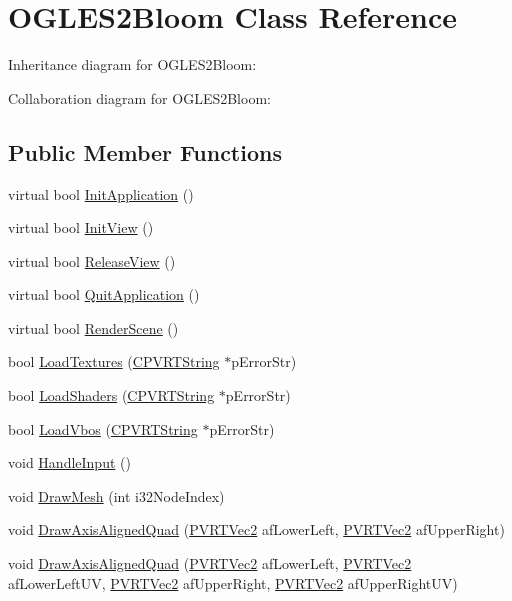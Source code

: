 \hypertarget{class_o_g_l_e_s2_bloom}{\section{O\+G\+L\+E\+S2\+Bloom Class Reference}
\label{class_o_g_l_e_s2_bloom}
}


Inheritance diagram for O\+G\+L\+E\+S2\+Bloom\+:


Collaboration diagram for O\+G\+L\+E\+S2\+Bloom\+:
\subsection*{Public Member Functions}
\begin{DoxyCompactItemize}
\item 
virtual bool \hyperlink{class_o_g_l_e_s2_bloom_a119c6ffe038283884e146738e336a3c4}{Init\+Application} ()
\item 
virtual bool \hyperlink{class_o_g_l_e_s2_bloom_a9f69f52e27a8913028fc9274da4ebfc2}{Init\+View} ()
\item 
virtual bool \hyperlink{class_o_g_l_e_s2_bloom_ae867ef7b57ab6e572bfea8a462c60dc1}{Release\+View} ()
\item 
virtual bool \hyperlink{class_o_g_l_e_s2_bloom_a3c4306c52a9c34807174b570482de5c2}{Quit\+Application} ()
\item 
virtual bool \hyperlink{class_o_g_l_e_s2_bloom_aae13baa51749f6c6d107264678b3a774}{Render\+Scene} ()
\item 
bool \hyperlink{class_o_g_l_e_s2_bloom_a75fa5ca2d311676a49750d47357737e5}{Load\+Textures} (\hyperlink{class_c_p_v_r_t_string}{C\+P\+V\+R\+T\+String} $\ast$p\+Error\+Str)
\item 
bool \hyperlink{class_o_g_l_e_s2_bloom_aafbbe1afa2e8a1285a1324d929b4ce16}{Load\+Shaders} (\hyperlink{class_c_p_v_r_t_string}{C\+P\+V\+R\+T\+String} $\ast$p\+Error\+Str)
\item 
bool \hyperlink{class_o_g_l_e_s2_bloom_a7a19667840eb88586fed64372d6695e9}{Load\+Vbos} (\hyperlink{class_c_p_v_r_t_string}{C\+P\+V\+R\+T\+String} $\ast$p\+Error\+Str)
\item 
void \hyperlink{class_o_g_l_e_s2_bloom_a444ae345e0ef19325619af6f11b7570f}{Handle\+Input} ()
\item 
void \hyperlink{class_o_g_l_e_s2_bloom_a930b31d005167550980b3dc951a1c46f}{Draw\+Mesh} (int i32\+Node\+Index)
\item 
void \hyperlink{class_o_g_l_e_s2_bloom_ae0d87d21a7f9690b174eaedb6be628c9}{Draw\+Axis\+Aligned\+Quad} (\hyperlink{struct_p_v_r_t_vec2}{P\+V\+R\+T\+Vec2} af\+Lower\+Left, \hyperlink{struct_p_v_r_t_vec2}{P\+V\+R\+T\+Vec2} af\+Upper\+Right)
\item 
void \hyperlink{class_o_g_l_e_s2_bloom_af064b10afdd444be4e6c0019b724d368}{Draw\+Axis\+Aligned\+Quad} (\hyperlink{struct_p_v_r_t_vec2}{P\+V\+R\+T\+Vec2} af\+Lower\+Left, \hyperlink{struct_p_v_r_t_vec2}{P\+V\+R\+T\+Vec2} af\+Lower\+Left\+U\+V, \hyperlink{struct_p_v_r_t_vec2}{P\+V\+R\+T\+Vec2} af\+Upper\+Right, \hyperlink{struct_p_v_r_t_vec2}{P\+V\+R\+T\+Vec2} af\+Upper\+Right\+U\+V)
\end{DoxyCompactItemize}


